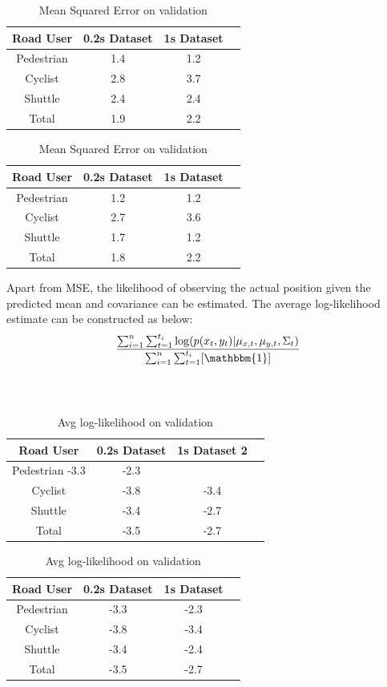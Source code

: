 \documentclass{article}
\begin{document}
\begin{table}[H]
\parbox{.45\linewidth}{
\centering
\begin{tabular}{@{}cccc@{}}
\toprule
Road User & 0.2s Dataset & 1s Dataset \\ \midrule
Pedestrian  & 1.4 & 1.2 \\ 
Cyclist  & 2.8 & 3.7 \\
Shuttle  & 2.4 & 2.4 \\  \midrule
Total & 1.9 & 2.2 \\    \midrule
\end{tabular}
\caption{Mean Squared Error on test}
\label{table:1}
}
\hfill
\parbox{.45\linewidth}{
\centering
\begin{tabular}{@{}cccc@{}}
\toprule
Road User & 0.2s Dataset & 1s Dataset \\ \midrule
Pedestrian  & 1.2 & 1.2 \\ 
Cyclist  & 2.7 & 3.6 \\
Shuttle  & 1.7 & 1.2 \\  \midrule
Total & 1.8 & 2.2 \\    \midrule
\end{tabular}
\caption{Mean Squared Error on validation}
\label{table:2}
}
\end{table}
Apart from MSE, the likelihood of observing the actual position given the predicted mean and covariance can be estimated. The average log-likelihood estimate can be constructed as below:
\begin{equation}
    \frac{\sum_{i=1}^n\sum_{t=1}^{t_i}\log(p(x_t,y_t)|\mu_{x,t},\mu_{y,t},\Sigma_t)}{\sum_{i=1}^n\sum_{t=1}^{t_i}[\mathbbm{1}]}
\end{equation}
\\
\\

\begin{table}[H]
\parbox{.45\linewidth}{
\centering
\begin{tabular}{@{}cccc@{}}
\toprule
Road User & 0.2s Dataset & 1s Dataset 2 \\ \midrule
Pedestrian  -3.3  & -2.3 \\ 
Cyclist  & -3.8 & -3.4 \\
Shuttle  & -3.4 & -2.7 \\  \midrule
Total & -3.5 & -2.7 \\    \midrule
\end{tabular}
\caption{Avg log-likelihood on test}
\label{table:3}
}
\hfill
\parbox{.5\linewidth}{
\centering
\begin{tabular}{@{}cccc@{}}
\toprule
Road User & 0.2s Dataset & 1s Dataset  \\ \midrule
Pedestrian  & -3.3 & -2.3 \\ 
Cyclist  & -3.8 & -3.4 \\
Shuttle  & -3.4 & -2.4 \\  \midrule
Total & -3.5 & -2.7 \\    \midrule
\end{tabular}
\caption{Avg log-likelihood on validation}
\label{table:4}
}
\end{table}
\end{document}
